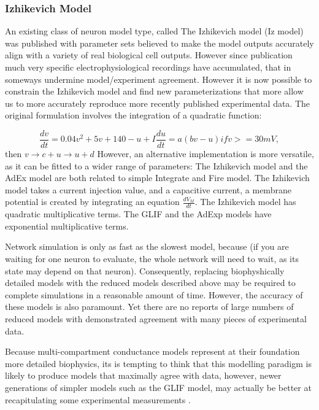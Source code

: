 \subsubsection{Izhikevich Model}
An existing class of neuron model type, called The Izhikevich model \cite{izhikevich2003simple} (Iz model) was published with parameter sets believed to make the model outputs accurately align with a variety of real biological cell outputs. However since publication much very specific electrophysiological recordings have accumulated, that in someways undermine model/experiment agreement. However it is now possible to constrain the Izhikevich model and find new parameterizations that more allow us to more accurately reproduce more recently published experimental data.
The original formulation involves the integration of a quadratic function:

\begin{displaymath}
\frac{dv}{dt}=0.04v^{2}+5v+140-u+I
\frac{du}{dt} = a(bv-u)
if v>=30mV,
\end{displaymath}
 then $ v \rightarrow c + u 	\rightarrow u+ d$
However, an alternative implementation is more versatile, as it can be fitted to a wider range of parameters:
The Izhikevich model and the AdEx model are both related to simple Integrate and Fire model.
The Izhikevich model takes a current injection value, and a capacitive current, a membrane potential is created by integrating an equation $\frac{dV_{M}}{dt}$.
The Izhikevich model has quadratic multiplicative terms.
The GLIF and the AdExp models have exponential multiplicative terms.

Network simulation is only as fast as the slowest model, because (if you are waiting for one neuron to evaluate, the whole network will need to wait, as its state may depend on that neuron).
Consequently, replacing biophyshically detailed models with the reduced models described above may be required to complete simulations in a reasonable amount of time.
However, the accuracy of these models is also paramount.
Yet there are no reports of large numbers of reduced models with demonstrated agreement with many pieces of experimental data.

Because multi-compartment conductance models represent at their foundation more detailed biophysics, its is tempting to think that this modelling paradigm is likely to produce models that maximally agree with data, however, newer generations of simpler models such as the GLIF model, may actually be better at recapitulating some experimental measurements \cite{meunier2002playing}.

